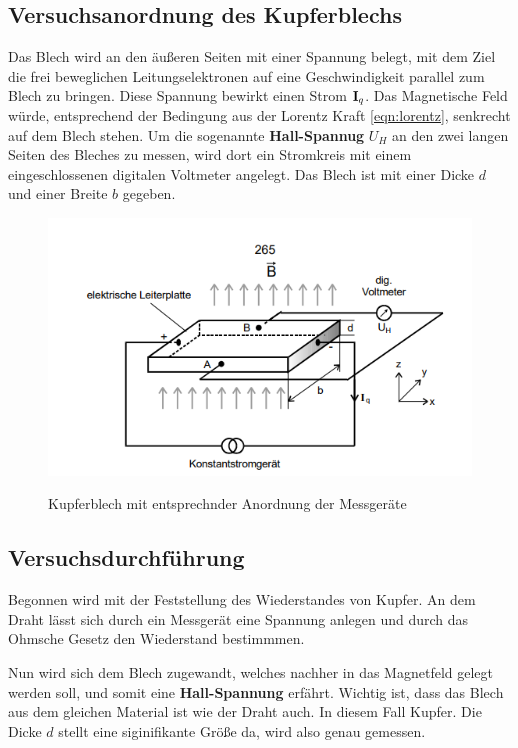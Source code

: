 \subsection{Versuchsanordnung des Kupferblechs}
\label{sec:Blech}
Das Blech wird an den äußeren Seiten mit einer Spannung belegt, mit dem Ziel die frei beweglichen Leitungselektronen auf eine Geschwindigkeit parallel zum 
Blech zu bringen. Diese Spannung bewirkt einen Strom $\text{\textbf{I}}_q$. Das Magnetische Feld würde, entsprechend der Bedingung aus der Lorentz Kraft \eqref{eqn:lorentz},
senkrecht auf dem Blech stehen. Um die sogenannte \textbf{Hall-Spannug} $U_H$ an den zwei langen Seiten des Bleches zu messen, wird dort ein Stromkreis
mit einem eingeschlossenen digitalen Voltmeter angelegt. Das Blech ist mit einer Dicke $d$ und einer Breite $b$ gegeben.

\begin{figure}
     \centering
     \includegraphics[width=\textwidth]{bilder/versuchsanordnung.png}
     \caption{Kupferblech mit entsprechnder Anordnung der Messgeräte}
     \cite[9]{V311.pdf}
     \label{fig:kupferblech}
\end{figure}

\subsection{Versuchsdurchführung}
Begonnen wird mit der Feststellung des Wiederstandes von Kupfer. An dem Draht lässt sich durch ein Messgerät eine Spannung anlegen und durch das Ohmsche Gesetz
den Wiederstand bestimmmen. \\ \flushleft

Nun wird sich dem Blech zugewandt, welches nachher in das Magnetfeld gelegt werden soll, und somit eine \textbf{Hall-Spannung} erfährt.
Wichtig ist, dass das Blech aus dem gleichen Material ist wie der Draht auch. In diesem Fall Kupfer. Die Dicke $d$ stellt eine siginifikante Größe da, wird also genau gemessen.\\ \flushleft


